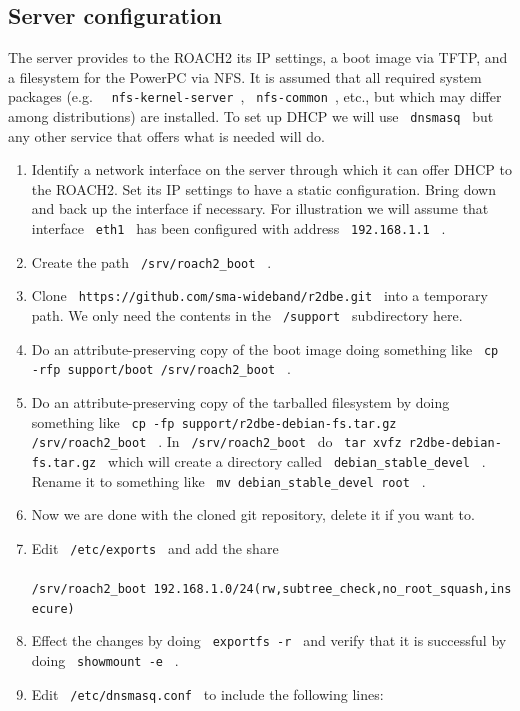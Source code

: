 \documentclass[a4paper,10pt]{article}
\newcommand{\ilcode}[1]{\begingroup
	\setlength{\fboxsep}{1pt}\colorbox{ilcodebg}{\small\tt%
		#1%
	}\endgroup}
\begin{document}
\subsection{Server configuration}
\label{sec:srvconf}
The server provides to the ROACH2 its IP settings, a boot image via 
TFTP, and a filesystem for the PowerPC via NFS. It is assumed that all 
required system packages (e.g.\ \ilcode{nfs-kernel-server}, 
\ilcode{nfs-common}, etc., but which may differ among distributions) are 
installed. To set up DHCP we will use \ilcode{dnsmasq} but any other
service that offers what is needed will do.

\begin{enumerate}
	\item Identify a network interface on the server through which it
	can offer DHCP to the ROACH2. Set its IP settings to have a static 
	configuration. Bring down and back up the interface if necessary. 
	For illustration we will assume that interface \ilcode{eth1} has 
	been configured with address \ilcode{192.168.1.1} .
	\item Create the path \ilcode{/srv/roach2\_boot} .
	\item Clone \ilcode{https://github.com/sma-wideband/r2dbe.git} into 
	a temporary path. We only need the contents in the \ilcode{/support} 
	subdirectory here.
	\item Do an attribute-preserving copy of the boot image
	doing something like
	\ilcode{cp -rfp support/boot /srv/roach2\_boot} .
	\item Do an attribute-preserving copy of the tarballed filesystem by 
	doing something like
	\ilcode{cp -fp support/r2dbe-debian-fs.tar.gz /srv/roach2\_boot} .
	In \ilcode{/srv/roach2\_boot} do
	\ilcode{tar xvfz r2dbe-debian-fs.tar.gz} which will create a 
	directory called \ilcode{debian\_stable\_devel} . Rename it to 
	something like 
	\ilcode{mv debian\_stable\_devel root} .
	\item Now we are done with the cloned git repository, delete it if 
	you want to.
	\item Edit \ilcode{/etc/exports} and add the share\\
	\ilcode{/srv/roach2\_boot\ 192.168.1.0/24(rw,subtree\_check,no\_root\_squash,insecure)}
	\item Effect the changes by doing \ilcode{exportfs -r} and verify that it
	is successful by doing \ilcode{showmount -e} .
	\item Edit \ilcode{/etc/dnsmasq.conf} to include the following lines:\\

\end{enumerate}
\end{document}
